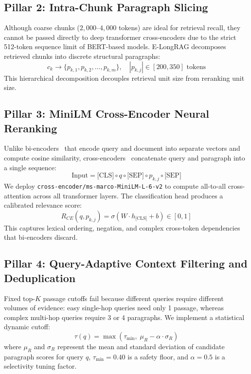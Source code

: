 \documentclass[10pt,journal,compsoc]{IEEEtran}
\begin{document}
\subsection{Pillar 2: Intra-Chunk Paragraph Slicing}
Although coarse chunks ($2,000$--$4,000$ tokens) are ideal for retrieval recall, they cannot be passed directly to deep transformer cross-encoders due to the strict 512-token sequence limit of BERT-based models. E-LongRAG decomposes retrieved chunks into discrete structural paragraphs:
\begin{equation}
c_k \longrightarrow \{ p_{k,1}, p_{k,2}, \dots, p_{k,m} \}, \quad |p_{k,j}| \in [200, 350] \text{ tokens}
\end{equation}
This hierarchical decomposition decouples retrieval unit size from reranking unit size.

\subsection{Pillar 3: MiniLM Cross-Encoder Neural Reranking}
Unlike bi-encoders~\cite{sbert} that encode query and document into separate vectors and compute cosine similarity, cross-encoders~\cite{crossencoder} concatenate query and paragraph into a single sequence:
\begin{equation}
\text{Input} = \text{[CLS]} \circ q \circ \text{[SEP]} \circ p_{k,j} \circ \text{[SEP]}
\end{equation}
We deploy \texttt{cross-encoder/ms-marco-MiniLM-L-6-v2} to compute all-to-all cross-attention across all transformer layers. The classification head produces a calibrated relevance score:
\begin{equation}
R_{CE}(q, p_{k,j}) = \sigma\left( W \cdot h_{\text{[CLS]}} + b \right) \in [0, 1]
\end{equation}
This captures lexical ordering, negation, and complex cross-token dependencies that bi-encoders discard.

\subsection{Pillar 4: Query-Adaptive Context Filtering and Deduplication}
Fixed top-$K$ passage cutoffs fail because different queries require different volumes of evidence: easy single-hop queries need only 1 passage, whereas complex multi-hop queries require 3 or 4 paragraphs. We implement a statistical dynamic cutoff:
\begin{equation}
\tau(q) = \max\left( \tau_{\min}, \; \mu_R - \alpha \cdot \sigma_R \right)
\end{equation}
where $\mu_R$ and $\sigma_R$ represent the mean and standard deviation of candidate paragraph scores for query $q$, $\tau_{\min} = 0.40$ is a safety floor, and $\alpha = 0.5$ is a selectivity tuning factor.
\end{document}
